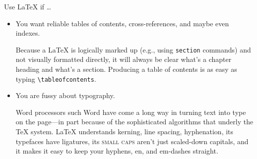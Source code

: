\begin{frame}[fragile]{Use \LaTeX{} if \dots}
\begin{itemize}
\item You want reliable tables of contents, cross-references, and maybe
  even indexes.

\begin{articleonly}
Because a \LaTeX{} is logically marked up (e.g., using \verb+section+
commands) and not visually formatted directly, it will always be clear
what's a chapter heading and what's a section. Producing a table of
contents is as easy as typing \texttt{\textbackslash tableofcontents}.
\end{articleonly}

\item You are fussy about typography.

\begin{articleonly}
Word processors such Word have come a long way in turning text into
type on the page---in part because of the sophisticated algorithms
that underly the \TeX{} system.  \LaTeX{} understands kerning, line
spacing, hyphenation, its typefaces have ligatures, its \textsc{small
  caps} aren't just scaled-down capitals, and it makes it easy to keep
your hyphens, en, and em-dashes straight.
\end{articleonly}
\end{itemize}

\end{frame}

